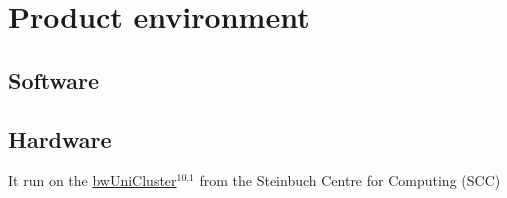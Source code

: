 \section{Product environment}
	\subsection{Software}
	\subsection{Hardware}
	It run on the \hyperlink{bwUniCluster}{bwUniCluster$^{10.1}$} from the Steinbuch Centre for Computing (SCC)
 